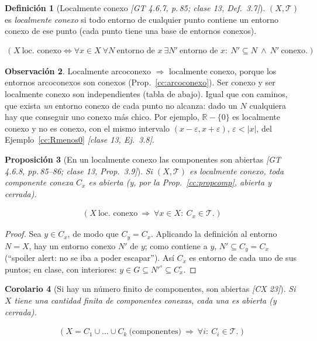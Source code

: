 \documentclass[11pt,a4paper]{article}
\newcommand{\lgc}[1]{\par\vspace{-3pt}\begin{gather*}\big(\;#1\;\big)\end{gather*}\vspace{-6pt}}
\theoremstyle{definition}
\newtheorem{definicion}{Definición}[section]
\newtheorem{observacion}[definicion]{Observación}
\theoremstyle{plain}
\newtheorem{proposicion}[definicion]{Proposición}
\newtheorem{corolario}[definicion]{Corolario}
\newcommand{\fnt}[1]{{\normalfont\small\itshape\color{gray!150!black}[#1]}}
\newcommand{\R}{\mathbb{R}}
\newcommand{\tp}{\mathcal{T}}
\begin{document}
\begin{definicion}[Localmente conexo \fnt{GT 4.6.7, p.\,85; clase 13, Def.\ 3.7}]\label{cc:deflocconex}
$(X,\tp)$ es \emph{localmente conexo} si todo entorno de cualquier punto contiene un entorno conexo de ese punto (cada punto tiene una base de entornos conexos).
\lgc{X\ \text{loc.\ conexo}\iff \forall x\in X\ \forall N\ \text{entorno de } x\ \exists N'\ \text{entorno de } x:\ N'\subseteq N\ \wedge\ N'\ \text{conexo}.}
\end{definicion}

\begin{observacion}
Localmente arcoconexo $\Rightarrow$ localmente conexo, porque los entornos arcoconexos son conexos (Prop.~\ref{cc:arcoconexo}). Ser conexo y ser localmente conexo son independientes (tabla de abajo). Igual que con caminos, que exista \emph{un} entorno conexo de cada punto no alcanza: dado un $N$ cualquiera hay que conseguir uno conexo más chico. Por ejemplo, $\R-\{0\}$ es localmente conexo y no es conexo, con el mismo intervalo $(x-\varepsilon,x+\varepsilon)$, $\varepsilon<|x|$, del Ejemplo~\ref{cc:Rmenos0} \fnt{clase 13, Ej.\ 3.8}.
\end{observacion}

\begin{proposicion}[En un localmente conexo las componentes son abiertas \fnt{GT 4.6.8, pp.\,85--86; clase 13, Prop.\ 3.9}]\label{cc:compab}
Si $(X,\tp)$ es localmente conexo, toda componente conexa $C_x$ es abierta (y, por la Prop.~\ref{cc:propcomp}, abierta y cerrada).
\lgc{X\ \text{loc.\ conexo}\ \Rightarrow\ \forall x\in X:\ C_x\in\tp.}
\end{proposicion}

\begin{proof}
Sea $y\in C_x$, de modo que $C_y=C_x$. Aplicando la definición al entorno $N=X$, hay un entorno conexo $N'$ de $y$; como contiene a $y$, $N'\subseteq C_y=C_x$ (``spoiler alert: no se iba a poder escapar''). Así $C_x$ es entorno de cada uno de sus puntos; en clase, con interiores: $y\in G\subseteq N'^\circ\subseteq C_x^\circ$.
\end{proof}

\begin{corolario}[Si hay un número finito de componentes, son abiertas \fnt{CX 23}]\label{cc:finitas}
Si $X$ tiene una cantidad finita de componentes conexas, cada una es abierta (y cerrada).
\lgc{X=C_1\cup\dots\cup C_k\ \text{(componentes)}\ \Rightarrow\ \forall i:\ C_i\in\tp.}
\end{corolario}
\end{document}
